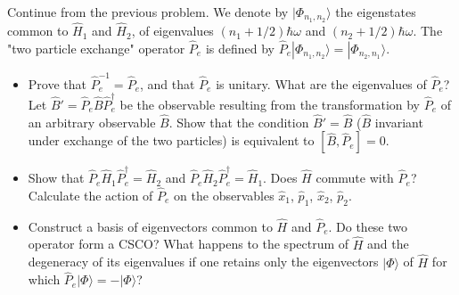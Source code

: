 \documentclass[12pt,a4paper]{article}
\newenvironment{problem}[2][Problem]{\begin{trivlist}
\item[\hskip \labelsep {\bfseries #1}\hskip \labelsep {\bfseries #2.}]}{\end{trivlist}}
\begin{document}
\begin{problem}{3}
[C-T Exercise 5-5] Continue from the previous problem. We denote by $|\Phi_{n_1,n_2}\rangle$ the eigenstates common to $\hat{H}_1$ and $\hat{H}_2$, of eigenvalues $(n_1+1/2)\hbar\omega$ and $(n_2+1/2)\hbar\omega$. The "two particle exchange" operator $\hat{P}_e$ is defined by $\hat{P}_e|\Phi_{n_1,n_2}\rangle=|\Phi_{n_2,n_1}\rangle$.
\begin{itemize}
\item[(a)] Prove that $\hat{P}_e^{-1}=\hat{P}_e$, and that $\hat{P}_e$ is unitary. What are the eigenvalues of $\hat{P}_e$? Let $\hat{B}'=\hat{P}_e\hat{B}\hat{P}_e^{\dagger}$ be the observable resulting from the transformation by $\hat{P}_e$ of an arbitrary observable $\hat{B}$. Show that the condition $\hat{B}'=\hat{B}$ ($\hat{B}$ invariant under exchange of the two particles) is equivalent to $[\hat{B},\hat{P}_e]=0$.
\item[(b)] Show that $\hat{P}_e\hat{H}_1\hat{P}_e^{\dagger}=\hat{H}_2$ and $\hat{P}_e\hat{H}_2\hat{P}_e^{\dagger}=\hat{H}_1$. Does $\hat{H}$ commute with $\hat{P}_e$? Calculate the action of $\hat{P}_e$ on the observables $\hat{x}_1$, $\hat{p}_1$, $\hat{x}_2$, $\hat{p}_2$.
\item[(c)] Construct a basis of eigenvectors common to $\hat{H}$ and $\hat{P}_e$. Do these two operator form a CSCO? What happens to the spectrum of $\hat{H}$ and the degeneracy of its eigenvalues if one retains only the eigenvectors $|\Phi\rangle$ of $\hat{H}$ for which $\hat{P}_e|\Phi\rangle=-|\Phi\rangle$? 
\end{itemize}
\end{problem}
\end{document}
